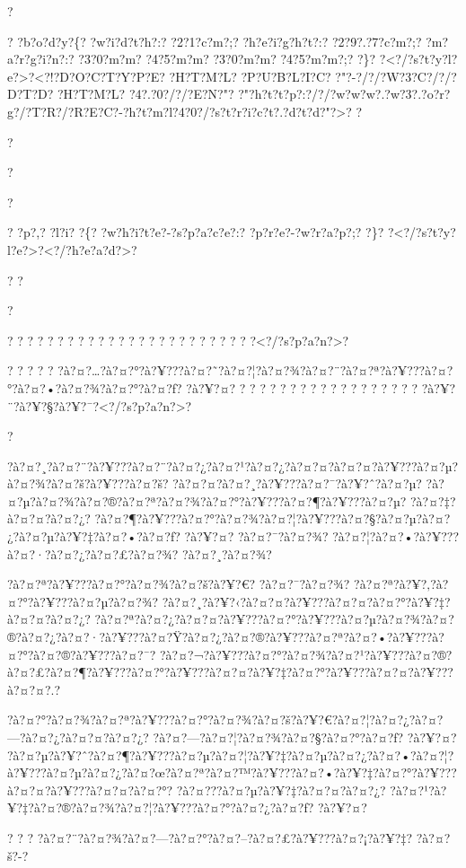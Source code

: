 \documentclass[11pt, openany]{book}
\begin{document}
{{{{{{{{{{{{{{{{{?

? ?b?o?d?y?\{? ?w?i?d?t?h?:? ?2?1?c?m?;? ?h?e?i?g?h?t?:? ?2?9?.?7?c?m?;?
?m?a?r?g?i?n?:? ?3?0?m?m? ?4?5?m?m? ?3?0?m?m? ?4?5?m?m?;? ?\}?
?\textless{}?/?s?t?y?l?e?\textgreater{}?\textless{}?!?D?O?C?T?Y?P?E?
?H?T?M?L? ?P?U?B?L?I?C? ?"?-?/?/?W?3?C?/?/?D?T?D? ?H?T?M?L?
?4?.?0?/?/?E?N?"?
?"?h?t?t?p?:?/?/?w?w?w?.?w?3?.?o?r?g?/?T?R?/?R?E?C?-?h?t?m?l?4?0?/?s?t?r?i?c?t?.?d?t?d?"?\textgreater{}?
?

?

?

?

? ?p?,? ?l?i? ?\{? ?w?h?i?t?e?-?s?p?a?c?e?:? ?p?r?e?-?w?r?a?p?;? ?\}?
?\textless{}?/?s?t?y?l?e?\textgreater{}?\textless{}?/?h?e?a?d?\textgreater{}?

? ?

?

? ? ? ? ? ? ? ? ? ? ? ? ? ? ? ? ? ? ? ? ? ? ? ?
?\textless{}?/?s?p?a?n?\textgreater{}?

? ? ? ? ?
?à?¤?\ldots{}?à?¤?°?à?¥???à?¤?˜?à?¤?¦?à?¤?¾?à?¤?¨?à?¤?ª?à?¥???à?¤?°?à?¤?•?à?¤?¾?à?¤?°?à?¤?ƒ?
?à?¥?¤? ? ? ? ? ? ? ? ? ? ? ? ? ? ? ? ? ? ?
?à?¥?¨?à?¥?§?à?¥?¯?\textless{}?/?s?p?a?n?\textgreater{}?

?

?à?¤?¸?à?¤?¨?à?¥???à?¤?¨?à?¤?¿?à?¤?¹?à?¤?¿?à?¤?¤?à?¤?¤?à?¥???à?¤?µ?à?¤?¾?à?¤?š?à?¥???à?¤?š?
?à?¤?¤?à?¤?¸?à?¥???à?¤?¯?à?¥?ˆ?à?¤?µ?
?à?¤?µ?à?¤?¾?à?¤?®?à?¤?ª?à?¤?¾?à?¤?°?à?¥???à?¤?¶?à?¥???à?¤?µ?
?à?¤?‡?à?¤?¤?à?¤?¿?
?à?¤?¶?à?¥???à?¤?°?à?¤?¾?à?¤?¦?à?¥???à?¤?§?à?¤?µ?à?¤?¿?à?¤?µ?à?¥?‡?à?¤?•?à?¤?ƒ?
?à?¥?¤? ?à?¤?¯?à?¤?¾? ?à?¤?¦?à?¤?•?à?¥???à?¤?·?à?¤?¿?à?¤?£?à?¤?¾?
?à?¤?¸?à?¤?¾?

?à?¤?ª?à?¥???à?¤?°?à?¤?¾?à?¤?š?à?¥?€? ?à?¤?¯?à?¤?¾?
?à?¤?ª?à?¥?‚?à?¤?°?à?¥???à?¤?µ?à?¤?¾?
?à?¤?¸?à?¥?‹?à?¤?¤?à?¥???à?¤?¤?à?¤?°?à?¥?‡?à?¤?¤?à?¤?¿?
?à?¤?ª?à?¤?¿?à?¤?¤?à?¥???à?¤?°?à?¥???à?¤?µ?à?¤?¾?à?¤?®?à?¤?¿?à?¤?·?à?¥???à?¤?Ÿ?à?¤?¿?à?¤?®?à?¥???à?¤?ª?à?¤?•?à?¥???à?¤?°?à?¤?®?à?¥???à?¤?¯?
?à?¤?¬?à?¥???à?¤?°?à?¤?¾?à?¤?¹?à?¥???à?¤?®?à?¤?£?à?¤?¶?à?¥???à?¤?°?à?¥???à?¤?¤?à?¥?‡?à?¤?°?à?¥???à?¤?¤?à?¥???à?¤?¤?.?

?à?¤?°?à?¤?¾?à?¤?ª?à?¥???à?¤?°?à?¤?¾?à?¤?š?à?¥?€?à?¤?¦?à?¤?¿?à?¤?---?à?¤?¿?à?¤?¤?à?¤?¿?
?à?¤?---?à?¤?¦?à?¤?¾?à?¤?§?à?¤?°?à?¤?ƒ? ?à?¥?¤?
?à?¤?µ?à?¥?ˆ?à?¤?¶?à?¥???à?¤?µ?à?¤?¦?à?¥?‡?à?¤?µ?à?¤?¿?à?¤?•?à?¤?¦?à?¥???à?¤?µ?à?¤?¿?à?¤?œ?à?¤?ª?à?¤?™?à?¥???à?¤?•?à?¥?‡?à?¤?°?à?¥???à?¤?¤?à?¥???à?¤?¤?à?¤?°?
?à?¤???à?¤?µ?à?¥?‡?à?¤?¤?à?¤?¿?
?à?¤?¹?à?¥?‡?à?¤?®?à?¤?¾?à?¤?¦?à?¥???à?¤?°?à?¤?¿?à?¤?ƒ? ?à?¥?¤?

? ? ? ?à?¤?¨?à?¤?¾?à?¤?---?à?¤?°?à?¤?--?à?¤?£?à?¥???à?¤?¡?à?¥?‡?
?à?¤?š?-?

}}}}}}}}}}}}}}}}}
\end{document}
